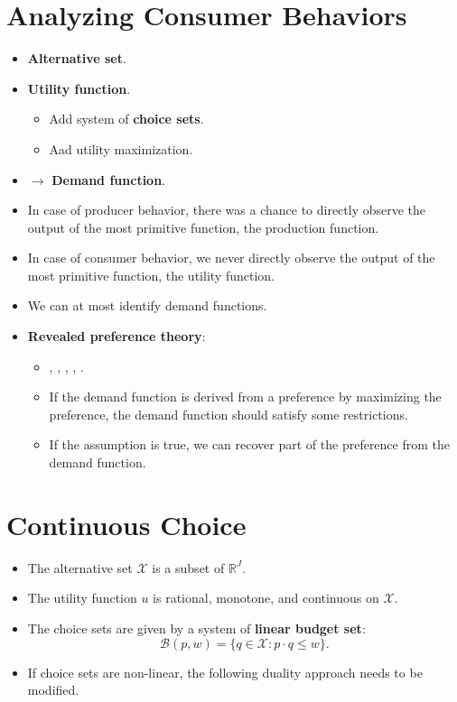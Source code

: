 \documentclass[
]{book}
\providecommand{\tightlist}{%
  \setlength{\itemsep}{0pt}\setlength{\parskip}{0pt}}
\begin{document}
\hypertarget{analyzing-consumer-behaviors}{%
\section{Analyzing Consumer Behaviors}\label{analyzing-consumer-behaviors}}

\begin{itemize}
\item
  \textbf{Alternative set}.
\item
  \textbf{Utility function}.

  \begin{itemize}
  \tightlist
  \item
    Add system of \textbf{choice sets}.
  \item
    Aad utility maximization.
  \end{itemize}
\item
  \(\rightarrow\) \textbf{Demand function}.
\item
  In case of producer behavior, there was a chance to directly observe the output of the most primitive function, the production function.
\item
  In case of consumer behavior, we never directly observe the output of the most primitive function, the utility function.
\item
  We can at most identify demand functions.
\item
  \textbf{Revealed preference theory}:

  \begin{itemize}
  \tightlist
  \item
    \citet{Samuelson1938}, \citet{Houthakker1950}, \citet{Richter1966}, \citet{Afriat1967}, \citet{Varian1982}.
  \item
    If the demand function is derived from a preference by maximizing the preference, the demand function should satisfy some restrictions.
  \item
    If the assumption is true, we can recover part of the preference from the demand function.
  \end{itemize}
\end{itemize}

\hypertarget{continuous-choice}{%
\section{Continuous Choice}\label{continuous-choice}}

\begin{itemize}
\tightlist
\item
  The alternative set \(\mathcal{X}\) is a subset of \(\mathbb{R}^J\).
\item
  The utility function \(u\) is rational, monotone, and continuous on \(\mathcal{X}\).
\item
  The choice sets are given by a system of \textbf{linear budget set}:
  \[
  \mathcal{B}(p, w) = \{q \in \mathcal{X}: p \cdot q \le w\}.
  \]
\item
  If choice sets are non-linear, the following duality approach needs to be modified.
\end{itemize}
\end{document}

